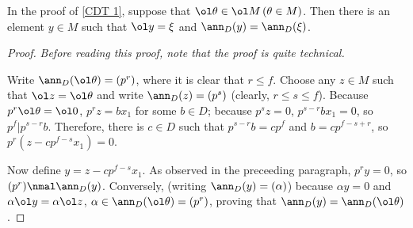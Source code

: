 \begin{lem}\label{a tool for proving the CDT existence part}
    In the proof of \cref{CDT 1}, suppose that $\ol\theta\in\ol M\,(\theta\in M)$.
    Then there is an element $y\in M$ such that $\ol y=\xi$ and $\ann_D(y)=\ann_D(\xi)$.
\end{lem}
\begin{proof}
    \textit{Before reading this proof, note that the proof is quite technical.}

    Write $\ann_D(\ol\theta)=(p^r)$, where it is clear that $r\leq f$.
    Choose any $z\in M$ such that $\ol z=\ol\theta$ and write $\ann_D(z)=(p^s)$ (clearly, $r\leq s\leq f$).
    Because $p^r\ol\theta=\ol 0$, $p^r z=bx_1$ for some $b\in D$; because $p^s z=0$, $p^{s-r}b x_1=0$, so $p^f|p^{s-r}b$.
    Therefore, there is $c\in D$ such that $p^{s-r}b=cp^f$ and $b=cp^{f-s+r}$, so $p^r(z-cp^{f-s}x_1)=0$.

    Now define $y=z-cp^{f-s}x_1$.
    As observed in the preceeding paragraph, $p^r y=0$, so $(p^r)\nmal\ann_D(y)$.
    Conversely, (writing $\ann_D(y)=(\alpha)$) because $\alpha y=0$ and $\alpha\ol y=\alpha\ol z$, $\alpha\in\ann_D(\ol\theta)=(p^r)$, proving that $\ann_D(y)=\ann_D(\ol\theta)$.
\end{proof}

